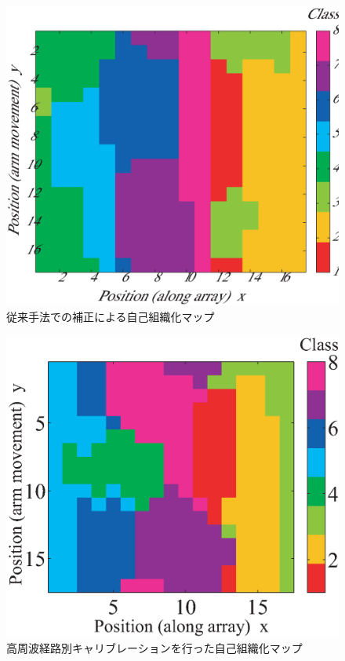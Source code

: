 ﻿\documentclass[12pt,oneside]{jsbook}
\begin{document}
\begin{figure}[btp]
\includegraphics[width =\hsize ]{20160726_mine1_som_old.eps}
\caption{従来手法での補正による自己組織化マップ}
\label{DChosei}
\end{figure}

\begin{figure}[btp]
\includegraphics[width =\hsize ]{20160726_mine1_som5.eps}
\caption{高周波経路別キャリブレーションを行った自己組織化マップ}
\label{RFhosei}
\end{figure}
\end{document}

